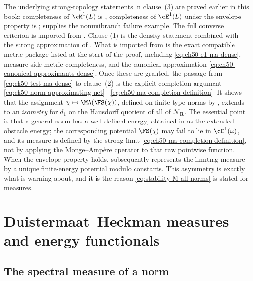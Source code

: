 \begin{remark}
\label{rem:ch50-completion-status}
The underlying strong-topology statements in clause~(3) are proved earlier
in this book: completeness of $\cM^1(L)$ is
, completeness of $\cE^1(L)$ under the
envelope property is ;
 supplies the nonunibranch failure
example.  The full converse criterion is imported from
\cite[Theorem~5.5(ii)]{BJKS1}.  Clause (1) is the density
statement  combined with the strong
approximation of .  What is imported from
\cite{BJKS1} is the exact compatible metric package listed at the start of
the proof, including \eqref{eq:ch50-e1-ma-dense}, measure-side metric
completeness, and the canonical approximation
\eqref{eq:ch50-canonical-approximants-dense}.  Once these are granted, the
passage from \eqref{eq:ch50-test-ma-dense} to clause~(2) is the explicit
completion argument \eqref{eq:ch50-norm-approximating-net}--
\eqref{eq:ch50-ma-completion-definition}.  It shows that the assignment
$\chi\mapsto\MA(\FS(\chi))$, defined on finite-type norms by
, extends to an
\emph{isometry} for $d_1$ on the Hausdorff quotient of all of
$\mathcal N_{\mathbf R}$.  The essential point is that a general norm
has a well-defined energy, obtained in \cite[Theorem~5.1]{BJKS1} as the
extended obstacle energy; the corresponding potential $\FS(\chi)$ may fail to lie
in $\cE^1(\omega)$, and its measure is defined by the strong limit
\eqref{eq:ch50-ma-completion-definition}, not by applying the
Monge--Amp\`ere operator to that raw pointwise function.  When the envelope
property holds,  subsequently represents the
limiting measure by a unique finite-energy potential modulo constants.
This asymmetry is exactly what
 is warning about, and it is the
reason \eqref{eq:stability-M-all-norms} is stated for measures.
\end{remark}

\section{Duistermaat--Heckman measures and energy functionals}
\label{sec:ch50-dh}

\subsection{The spectral measure of a norm}
\label{sec:ch50-spectral-measure}

